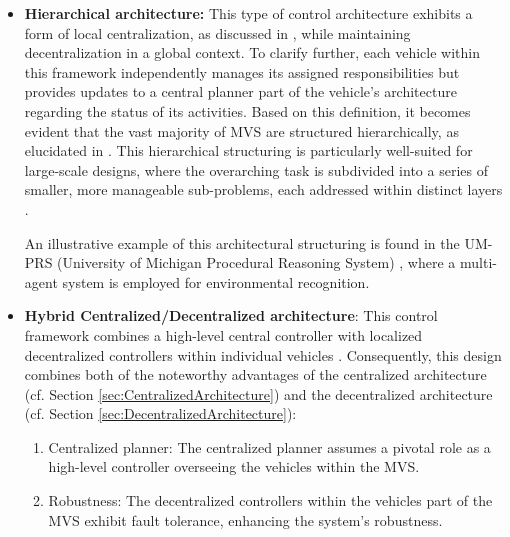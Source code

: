\begin{itemize}



\item \textbf{Hierarchical architecture:} This type of control architecture exhibits a form of local centralization, as discussed in \cite{ren2008distributed}\cite{adouane2006behavioral}\cite{assaad2019overview}, while maintaining decentralization in a global context. To clarify further, each vehicle within this framework independently manages its assigned responsibilities but provides updates to a central planner part of the vehicle's architecture regarding the status of its activities. Based on this definition, it becomes evident that the vast majority of MVS are structured hierarchically, as elucidated in \cite{girard2001overview}\cite{karagiannis2011vehicular}. This hierarchical structuring is particularly well-suited for large-scale designs, where the overarching task is subdivided into a series of smaller, more manageable sub-problems, each addressed within distinct layers \cite{varaiya2000question}. 

An illustrative example of this architectural structuring is found in the UM-PRS (University of Michigan Procedural Reasoning System) \cite{lee1994prs}\cite{lee1999reactive}, where a multi-agent system is employed for environmental recognition. 








\item \textbf{Hybrid Centralized/Decentralized architecture}: This control framework combines a high-level central controller with localized decentralized controllers within individual vehicles \cite{assaad2019overview}\cite{noreils1993toward}\cite{siciliano2008springer}\cite{ventura2015safe}. Consequently, this design combines both of the noteworthy advantages of the centralized architecture (cf. Section \ref{sec:CentralizedArchitecture}) and the decentralized architecture (cf. Section \ref{sec:DecentralizedArchitecture}): 
\begin{enumerate}
    \item Centralized planner: The centralized planner assumes a pivotal role as a high-level controller overseeing the vehicles within the MVS. 

    \item Robustness: The decentralized controllers within the vehicles part of the MVS exhibit fault tolerance, enhancing the system's robustness. 


\end{enumerate}
\end{itemize}
